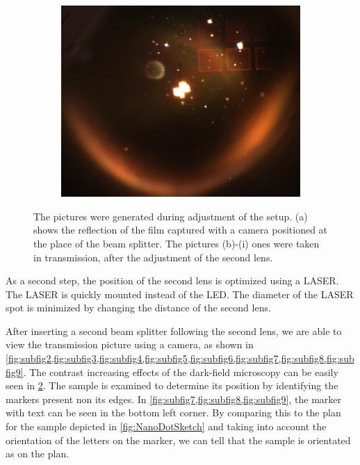 \begin{figure}[ht]
\begin{subfigure}{0.3\linewidth}
      \includegraphics[width=\linewidth]{data/Gruppe2/image_8.png}
      \caption{}
      \label{fig:subfig9}
    \end{subfigure}
    
    \caption{The pictures were generated during adjustment of the setup. (a) shows the reflection of the film captured with a camera positioned at the place of the beam splitter. The pictures (b)-(i) ones were taken in transmission, after the adjustment of the second lens.}
    \label{fig:subfigure-grid}
\end{figure}

As a second step, the position of the second lens is optimized using a LASER. The LASER is quickly mounted instead of the LED. The diameter of the LASER spot is minimized by changing the distance of the second lens.

After inserting a second beam splitter following the second lens, we are able to view the transmission picture using a camera, as shown in \cref{fig:subfig2,fig:subfig3,fig:subfig4,fig:subfig5,fig:subfig6,fig:subfig7,fig:subfig8,fig:subfig9}. The contrast increasing effects
of the dark-field microscopy can be easily seen in \cref{fig:subfigure-grid}. The sample is examined to determine its position by identifying the markers present non its edges. In \cref{fig:subfig7,fig:subfig8,fig:subfig9}, the marker with text can be seen in the bottom left corner. 
By comparing this to the plan for the sample depicted in \cref{fig:NanoDotSketch} and taking into account the orientation of the 
letters on the marker, we can tell that the sample is orientated as on the plan.
 


